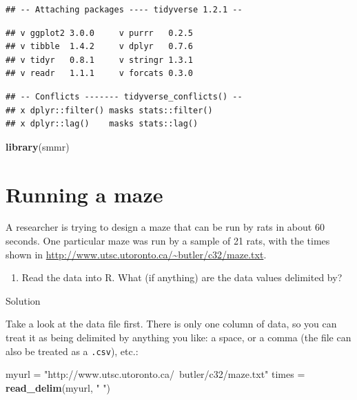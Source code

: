 \documentclass[]{tufte-book}
\newenvironment{Shaded}{}{}
\newcommand{\KeywordTok}[1]{\textcolor[rgb]{0.00,0.44,0.13}{\textbf{#1}}}
\newcommand{\NormalTok}[1]{#1}
\newcommand{\StringTok}[1]{\textcolor[rgb]{0.25,0.44,0.63}{#1}}
\providecommand{\tightlist}{%
  \setlength{\itemsep}{0pt}\setlength{\parskip}{0pt}}
\theoremstyle{definition}
\theoremstyle{definition}
\theoremstyle{definition}
\theoremstyle{remark}
\begin{document}
\begin{verbatim}
## -- Attaching packages ---- tidyverse 1.2.1 --
\end{verbatim}

\begin{verbatim}
## v ggplot2 3.0.0     v purrr   0.2.5
## v tibble  1.4.2     v dplyr   0.7.6
## v tidyr   0.8.1     v stringr 1.3.1
## v readr   1.1.1     v forcats 0.3.0
\end{verbatim}

\begin{verbatim}
## -- Conflicts ------- tidyverse_conflicts() --
## x dplyr::filter() masks stats::filter()
## x dplyr::lag()    masks stats::lag()
\end{verbatim}

\begin{Shaded}
\begin{Highlighting}[]
\KeywordTok{library}\NormalTok{(smmr)}
\end{Highlighting}
\end{Shaded}

\hypertarget{running-a-maze}{%
\section{Running a maze}\label{running-a-maze}}

A researcher is trying to design a maze that can be run by rats in about
60 seconds. One particular maze was run by a sample of 21 rats, with the
times shown in \url{http://www.utsc.utoronto.ca/~butler/c32/maze.txt}.

\begin{enumerate}
\def\labelenumi{(\alph{enumi})}
\tightlist
\item
  Read the data into R. What (if anything) are the data values delimited
  by?
\end{enumerate}

Solution

Take a look at the data file first. There is only one column of data, so
you can treat it as being delimited by anything you like: a space, or a
comma (the file can also be treated as a \texttt{.csv}), etc.:

\begin{Shaded}
\begin{Highlighting}[]
\NormalTok{myurl =}\StringTok{ "http://www.utsc.utoronto.ca/~butler/c32/maze.txt"}
\NormalTok{times =}\StringTok{ }\KeywordTok{read_delim}\NormalTok{(myurl, }\StringTok{" "}\NormalTok{)}
\end{Highlighting}
\end{Shaded}
\end{document}
